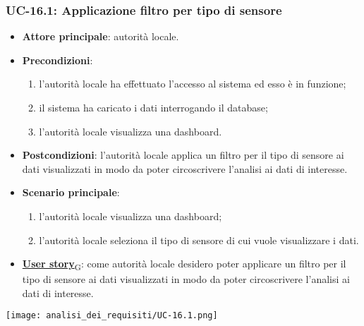 \subsubsection{UC-16.1: Applicazione filtro per tipo di sensore}
\begin{itemize}
	\item \textbf{Attore principale}: autorità locale.
	\item \textbf{Precondizioni}:
	      \begin{enumerate}
		      \item l'autorità locale ha effettuato l'accesso al sistema ed esso è in funzione;
		      \item il sistema ha caricato i dati interrogando il database;
		      \item l'autorità locale visualizza una dashboard.
	      \end{enumerate}
	\item \textbf{Postcondizioni}: l'autorità locale applica un filtro per il tipo di sensore ai dati visualizzati in modo da poter circoscrivere l'analisi ai dati di interesse.
	\item \textbf{Scenario principale}:
	      \begin{enumerate}
		      \item l'autorità locale visualizza una dashboard;
		      \item l'autorità locale seleziona il tipo di sensore di cui vuole visualizzare i dati.
	      \end{enumerate}
	\item \href{https://7last.github.io/docs/pb/documentazione-interna/glossario\#user-story}{\textbf{User story}\textsubscript{G}}:
	      come autorità locale desidero poter applicare un filtro per il tipo di sensore ai dati visualizzati in modo da poter circoscrivere l'analisi ai dati di interesse.
\end{itemize}
\begin{center}
	\texttt{[image: analisi\_dei\_requisiti/UC-16.1.png]}
\end{center}

